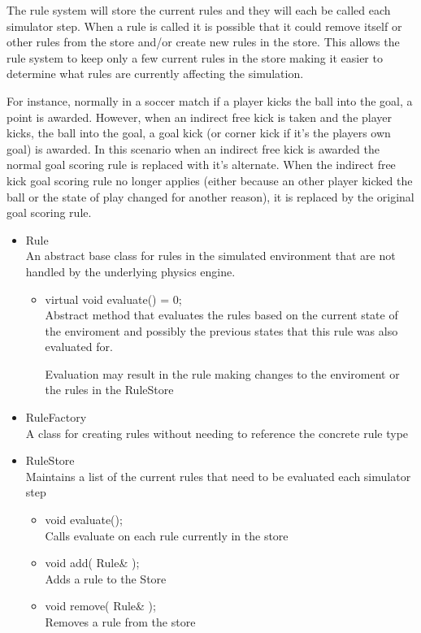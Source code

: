 \documentclass[a4paper,12pt]{article}
\begin{document}
The rule system will store the current rules and they will each be called each
simulator step.  When a rule is called it is possible that it could remove itself
or other rules from the store and/or create new rules in the store.  This allows
the rule system to keep only a few current rules in the store making it easier to
determine what rules are currently affecting the simulation.

For instance, normally in a soccer match if a player kicks the ball into the goal,
a point is awarded.  However, when an indirect free kick is taken and the player kicks,
the ball into the goal, a goal kick (or corner kick if it's the players own goal) is
awarded.  In this scenario when an indirect free kick is awarded the normal goal scoring
rule is replaced with it's alternate.  When the indirect free kick goal scoring rule
no longer applies (either because an other player kicked the ball or the state of play
changed for another reason), it is replaced by the original goal scoring rule.

\begin{itemize}
\item Rule\\
  An abstract base class for rules in the simulated environment that are not
  handled by the underlying physics engine.
  \begin{itemize}
  \item virtual void evaluate() = 0;\\
    Abstract method that evaluates the rules based on the current state of
    the enviroment and possibly the previous states that this rule was also
    evaluated for.

    Evaluation may result in the rule making changes to the enviroment or the
    rules in the RuleStore
  \end{itemize}

\item RuleFactory\\
  A class for creating rules without needing to reference the concrete rule type

\item RuleStore\\
  Maintains a list of the current rules that need to be evaluated each simulator
  step
  \begin{itemize}
  \item void evaluate();\\
    Calls evaluate on each rule currently in the store
  \item void add( Rule\& );\\
    Adds a rule to the Store
  \item void remove( Rule\& );\\
    Removes a rule from the store
  \end{itemize}
\end{itemize}
\end{document}
